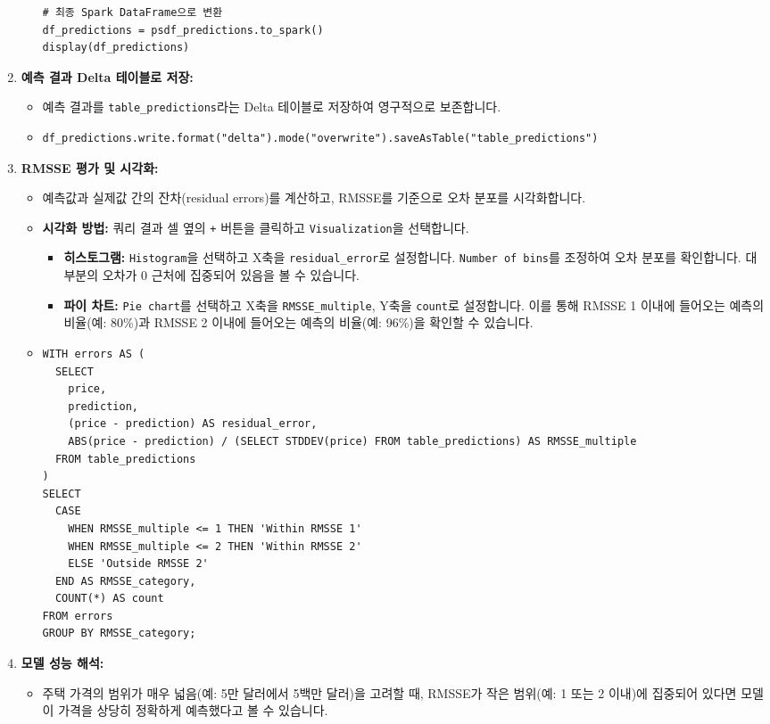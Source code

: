 \documentclass[11pt,a4paper]{article}
\theoremstyle{definition}
\newcommand{\code}[1]{\texttt{#1}}
\begin{document}
\begin{enumerate}
\begin{itemize}
\begin{lstlisting}[caption=예측 수행 코드]
# 최종 Spark DataFrame으로 변환
df_predictions = psdf_predictions.to_spark()
display(df_predictions)
        \end{lstlisting}
    \end{itemize}
    \item \textbf{예측 결과 Delta 테이블로 저장:}
    \begin{itemize}
        \item 예측 결과를 \code{table_predictions}라는 Delta 테이블로 저장하여 영구적으로 보존합니다.
        \item 
        \begin{lstlisting}[caption=예측 결과 Delta 테이블 저장 코드]
df_predictions.write.format("delta").mode("overwrite").saveAsTable("table_predictions")
        \end{lstlisting}
    \end{itemize}
    \item \textbf{RMSSE 평가 및 시각화:}
    \begin{itemize}
        \item 예측값과 실제값 간의 잔차(residual errors)를 계산하고, RMSSE를 기준으로 오차 분포를 시각화합니다.
        \item \textbf{시각화 방법:} 쿼리 결과 셀 옆의 \code{+} 버튼을 클릭하고 \code{Visualization}을 선택합니다.
        \begin{itemize}
            \item \textbf{히스토그램:} \code{Histogram}을 선택하고 X축을 \code{residual_error}로 설정합니다. \code{Number of bins}를 조정하여 오차 분포를 확인합니다. 대부분의 오차가 0 근처에 집중되어 있음을 볼 수 있습니다.
            \item \textbf{파이 차트:} \code{Pie chart}를 선택하고 X축을 \code{RMSSE_multiple}, Y축을 \code{count}로 설정합니다. 이를 통해 RMSSE 1 이내에 들어오는 예측의 비율(예: 80\%)과 RMSSE 2 이내에 들어오는 예측의 비율(예: 96\%)을 확인할 수 있습니다.
        \end{itemize}
        \item 
        \begin{lstlisting}[caption=RMSSE 평가 및 시각화 쿼리]
%sql
WITH errors AS (
  SELECT
    price,
    prediction,
    (price - prediction) AS residual_error,
    ABS(price - prediction) / (SELECT STDDEV(price) FROM table_predictions) AS RMSSE_multiple
  FROM table_predictions
)
SELECT
  CASE
    WHEN RMSSE_multiple <= 1 THEN 'Within RMSSE 1'
    WHEN RMSSE_multiple <= 2 THEN 'Within RMSSE 2'
    ELSE 'Outside RMSSE 2'
  END AS RMSSE_category,
  COUNT(*) AS count
FROM errors
GROUP BY RMSSE_category;
        \end{lstlisting}
    \end{itemize}
    \item \textbf{모델 성능 해석:}
    \begin{itemize}
        \item 주택 가격의 범위가 매우 넓음(예: 5만 달러에서 5백만 달러)을 고려할 때, RMSSE가 작은 범위(예: 1 또는 2 이내)에 집중되어 있다면 모델이 가격을 상당히 정확하게 예측했다고 볼 수 있습니다.
    \end{itemize}
\end{enumerate}
\end{document}
